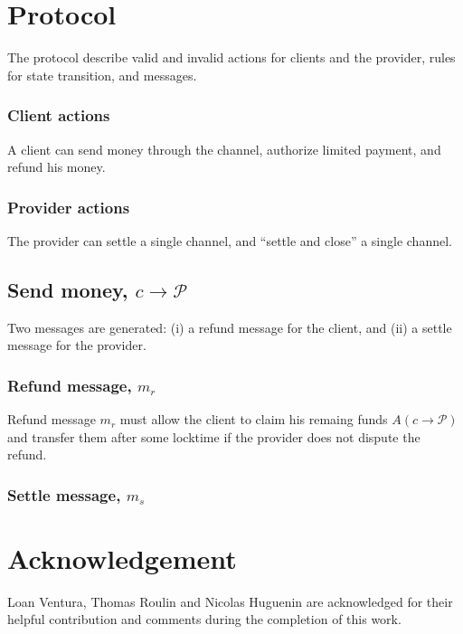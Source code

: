 \documentclass{llncs}
\begin{document}
\section{Protocol} The protocol describe valid and invalid actions for clients and the provider, rules for state transition, and messages.

\subsubsection{Client actions} A client can send money through the channel, authorize limited payment, and refund his money.

\subsubsection{Provider actions} The provider can settle a single channel, and ``settle and close'' a single channel.

\subsection{Send money, $c \rightarrow \mathcal{P}$} Two messages are generated: (i) a refund message for the client, and (ii) a settle message for the provider.

\subsubsection{Refund message, $m_r$} Refund message $m_r$ must allow the client to claim his remaing funds $A(c \rightarrow \mathcal{P})$ and transfer them after some locktime if the provider does not dispute the refund. 

\subsubsection{Settle message, $m_s$}


\section{Acknowledgement} Loan Ventura, Thomas Roulin and Nicolas Huguenin are acknowledged for their helpful contribution and comments during the completion of this work.

%
%
\printbibliography
\end{document}
